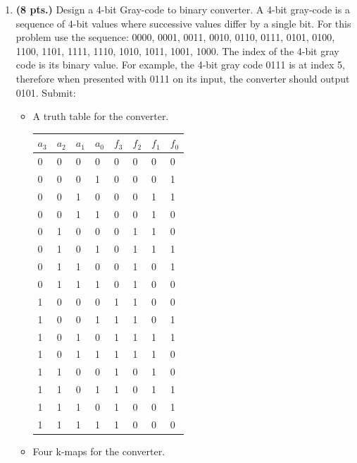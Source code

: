 \begin{enumerate}
\begin{itemize}
\end{itemize}

\item  {\bf (8 pts.)}
Design a 4-bit Gray-code to binary converter.  A 4-bit gray-code is a 
sequence of 4-bit values where successive values differ by a single
bit.  For this problem use the sequence: 0000, 0001, 0011, 0010, 
0110, 0111, 0101, 0100, 1100, 1101, 1111, 1110, 1010, 1011, 1001, 
1000.  The index of the 4-bit gray code is its binary value.  For
example, the 4-bit gray code 0111 is at index 5, therefore when
presented with 0111 on its input, the converter should output 0101.
Submit:
\begin{itemize}
\item A truth table for the converter.

\begin{solution}{
\begin{tabular}{l|l|l|l||l|l|l|l}
$a_3$ & $a_2$ & $a_1$ & $a_0$ & $f_3$ & $f_2$ & $f_1$ & $f_0$ \\ \hline
0&0&0&0 &0&0&0&0 \\ \hline
0&0&0&1 &0&0&0&1 \\ \hline
0&0&1&0 &0&0&1&1 \\ \hline
0&0&1&1 &0&0&1&0 \\ \hline
0&1&0&0 &0&1&1&0 \\ \hline
0&1&0&1 &0&1&1&1 \\ \hline
0&1&1&0 &0&1&0&1 \\ \hline
0&1&1&1 &0&1&0&0 \\ \hline
1&0&0&0 &1&1&0&0 \\ \hline
1&0&0&1 &1&1&0&1 \\ \hline
1&0&1&0 &1&1&1&1 \\ \hline
1&0&1&1 &1&1&1&0 \\ \hline
1&1&0&0 &1&0&1&0 \\ \hline
1&1&0&1 &1&0&1&1 \\ \hline
1&1&1&0 &1&0&0&1 \\ \hline
1&1&1&1 &1&0&0&0 \\ 
\end{tabular}
} \end{solution}

\item Four k-maps for the converter.


\end{itemize}
\end{enumerate}
